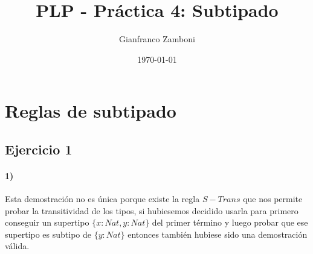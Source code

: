 \documentclass[10pt,a4paper, landscape]{article}
\begin{document}
	\title{PLP - Práctica 4: Subtipado}
	
	\date{\today}
	
	\author{Gianfranco Zamboni}
	
	\maketitle
	\setcounter{page}{1}
	
	\section*{\centering Reglas de subtipado}
	\subsection{Ejercicio 1}
	\paragraph{1)}
	\begin{multicols}{2}
		\begin{center}
			\begin{scprooftree}
				\def\extraVskip{5pt}
				
				
				
			\end{scprooftree}
		\end{center}
		\vfill\null
		\columnbreak
		Esta demostración no es única porque existe la regla $S-Trans$ que nos permite probar la transitividad de los tipos, si hubiesemos decidido usarla para primero conseguir un supertipo $\{x:Nat,y:Nat\}$ del primer término y luego probar que ese supertipo es subtipo de $\{y:Nat\}$ entonces también hubiese sido una demostración válida.
		
	\end{multicols}
	
	\vspace*{1cm}
	\setlength{\columnsep}{-1cm}
\end{document}
